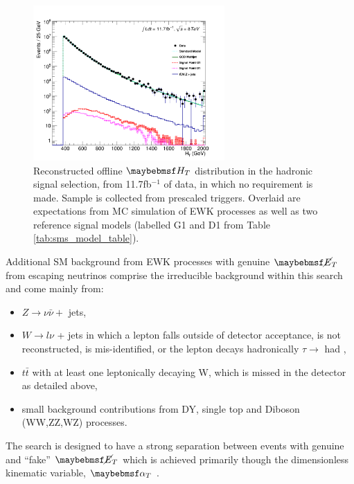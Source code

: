 \begin{figure}[!h]

\centering
\includegraphics[width=0.65\textwidth]{plots/ra1_htdistribution.pdf}
\caption[Reconstructed offline $\theht$ distribution in the hadronic signal selection, from 11.7fb$^{-1}$ of data, in which no \alphat requirement is made.]{Reconstructed offline $\theht$ distribution in the hadronic signal selection, from 11.7fb$^{-1}$ of data, in which no \alphat requirement is made. Sample is collected from prescaled \theht triggers. Overlaid are expectations from MC simulation of \ac{EWK} processes as well as two reference signal models (labelled G1 and D1 from Table \ref{tab:sms_model_table}).}  
\label{fig:htqcdbackground}
\end{figure}

Additional \ac{SM} background from \ac{EWK} processes with genuine $\met$ from escaping neutrinos comprise the irreducible background within this search and come mainly from:

\begin{itemize}
\item $Z \rightarrow \nu\bar{\nu} +$ jets,
\item $W \rightarrow l\nu$ + jets in which a lepton falls outside of detector acceptance, is not reconstructed, is mis-identified, or the lepton decays hadronically $\tau \rightarrow$ had ,
\item $t\bar{t}$ with at least one leptonically decaying W, which is missed in the detector as detailed above,
\item small background contributions from DY, single top and Diboson (WW,ZZ,WZ) processes.
\end{itemize}

The search is designed to have a strong separation between events with genuine and ``fake'' $\met$ which is achieved primarily though the dimensionless kinematic variable, $\alphat$ \cite{alphat7tev}\cite{CMS:2008vya}.

